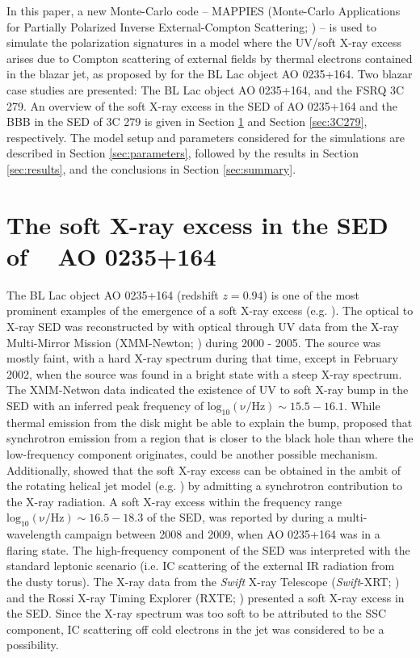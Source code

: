 \documentclass[twocolumn, tighten, twocolappendix]{aastex63}
\begin{document}
In this paper, a new Monte-Carlo code -- MAPPIES (Monte-Carlo Applications for Partially Polarized Inverse External-Compton Scattering; \cite{PaperI}) -- is used to simulate the polarization signatures in a model where the UV/soft X-ray excess arises due to Compton scattering of external fields by thermal electrons contained in the blazar jet, as proposed by \cite{Baring_etal2017} for the BL Lac object AO 0235+164. Two blazar case studies are presented: The BL Lac object AO 0235+164, and the FSRQ 3C 279. An overview of the soft X-ray excess in the SED of AO 0235+164 and the BBB in the SED of 3C 279 is given in Section \ref{sec:0235+164} and Section \ref{sec:3C279}, respectively. The model setup and parameters considered for the simulations are described in Section \ref{sec:parameters}, followed by the results in Section \ref{sec:results}, and the conclusions in Section \ref{sec:summary}. 
\section{The soft X-ray excess in the SED of ~ AO 0235+164}\label{sec:0235+164}
The BL Lac object AO 0235+164 (redshift $z = 0.94$) is one of the most prominent examples of the emergence of a soft X-ray excess (e.g. \cite{Junkkarinen_2004, Raiteri_etal2005, Ackermann_etal2012}). The optical to X-ray SED was reconstructed by \cite{Raiteri_etal2006} with optical through UV data from the X-ray Multi-Mirror Mission (XMM-Newton; \cite{Talavera_2009}) during 2000 - 2005. The source was mostly faint, with a hard X-ray spectrum during that time, except in February 2002, when the source was found in a bright state with a steep X-ray spectrum. The XMM-Netwon data indicated the existence of UV to soft X-ray bump in the SED with an inferred peak frequency of $\mathrm{log_{10}(\nu/ Hz)}\sim 15.5-16.1$. While thermal emission from the disk might be able to explain the bump, \cite{Raiteri_etal2006} proposed that synchrotron emission from a region that is closer to the black hole than where the low-frequency component originates, could be another possible mechanism. Additionally, \cite{Ostorero_etal2004} showed that the soft X-ray excess can be obtained in the ambit of the rotating helical jet model (e.g. \cite{Villata_Raiteri_1999}) by admitting a synchrotron contribution to the X-ray radiation. 
A soft X-ray excess within the frequency range $\mathrm{log_{10}(\nu/ Hz)}\sim 16.5-18.3$ of the SED, was reported by \cite{Ackermann_etal2012} during a multi-wavelength campaign between 2008 and 2009, when AO 0235+164 was in a flaring state. The high-frequency component of the SED was interpreted with the standard leptonic scenario (i.e. IC scattering of the external IR radiation from the dusty torus). The X-ray data from the \textit{Swift} X-ray Telescope (\textit{Swift}-XRT; \cite{Burrows_etal2005}) and the Rossi X-ray Timing Explorer (RXTE; \cite{Rothschild_etal1998}) presented a soft X-ray excess in the SED. Since the X-ray spectrum was too soft to be attributed to the SSC component, IC scattering off cold electrons in the jet was considered to be a possibility.
\end{document}
